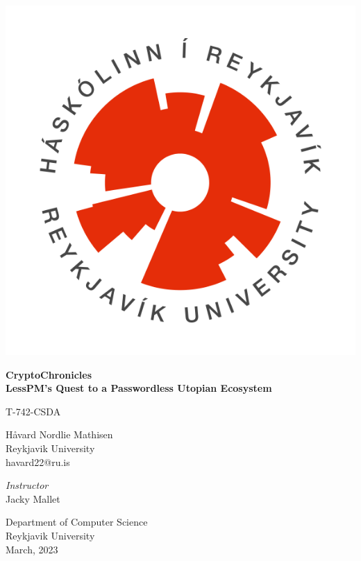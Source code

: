 \documentclass[twocolumn]{article}
\title{\titleHeading}
\author{Håvard Nordlie Mathisen}
\date{January, 2023}
\newcommand{\jacky}{Jacky Mallet}
\newcommand{\secu}{T-742-CSDA}
\newcommand{\titleHeading}{CryptoChronicles}
\newcommand{\titleSubheading}{LessPM's Quest to a Passwordless Utopian Ecosystem}
\newcommand{\subjectName}{\secu}
\newcommand{\instructorName}{\jacky}
\begin{document}
    \begin{titlepage}
        \begin{center}
            \includegraphics[scale=0.4]{images/HR_logo_hringur_transparent}

            \huge
            \textbf{\titleHeading}\\
            \Large
            \textbf{\titleSubheading}

            \vspace{1cm}
            \large
            \subjectName

            \vspace{0.5cm}
            \Large
            Håvard Nordlie Mathisen\\
            \large
            Reykjavik University\\
            havard22@ru.is


            \vfill

            \normalsize
            \textit{Instructor}\\
            \instructorName

            \vspace{0.8cm}

            Department of Computer Science\\
            Reykjavik University\\
            March, 2023\\

        \end{center}
    \end{titlepage}
\end{document}
